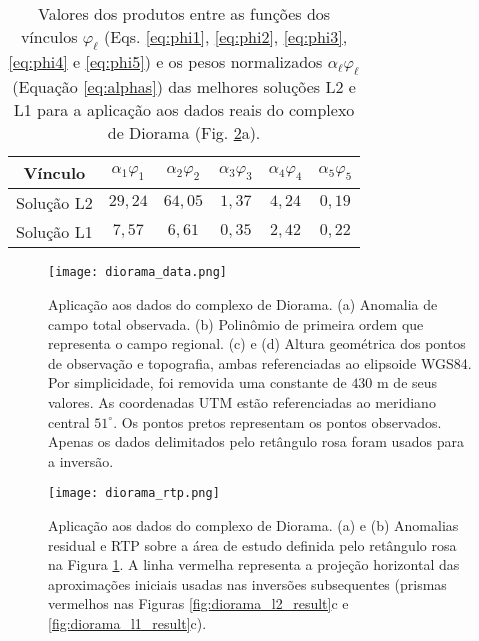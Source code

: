 \begin{table}[h]\label{tab:diorama}
	\caption{Valores dos produtos entre as funções dos vínculos $ \varphi_{\ell} $ (Eqs. \ref{eq:phi1}, \ref{eq:phi2}, \ref{eq:phi3}, \ref{eq:phi4} e \ref{eq:phi5}) e os pesos normalizados $ \alpha_\ell \varphi_\ell  $ (Equação \ref{eq:alphas}) das melhores soluções L2 e L1 para a aplicação aos dados reais do complexo de Diorama (Fig. \ref{fig:diorama_rtp_residual}a).}
	\centering
	\vspace{0.5cm}
	\begin{tabular}{c|ccccc}
		Vínculo & $ \alpha_{1}\varphi _1 $ & $ \alpha_{2}\varphi _2 $ &  $ \alpha_{3}\varphi _3 $ &  $ \alpha_{4}\varphi _4 $ &  $ \alpha_{5}\varphi _5 $ \\
		\hline
		Solução L2 & $ 29,24 $ & $ 64,05 $ & $ 1,37 $ & $ 4,24 $ & $ 0,19 $ \\ 
		Solução L1 & $ 7,57 $ & $ 6,61 $ & $ 0,35 $ & $ 2,42 $ & $ 0,22 $
	\end{tabular}
\end{table}



\begin{figure}[!htb]
	\texttt{[image: diorama\_data.png]}
	\caption{Aplicação aos dados do complexo de Diorama. 
		(a) Anomalia de campo total observada.
		(b) Polinômio de primeira ordem que representa o campo regional.
		(c) e (d) Altura geométrica dos pontos de observação e topografia,
		ambas referenciadas ao elipsoide WGS84. Por simplicidade, foi removida uma constante de $430$ m de seus valores. As coordenadas UTM estão referenciadas ao meridiano central $51^{\circ}$. Os pontos pretos representam os pontos observados. Apenas os dados delimitados pelo retângulo rosa foram usados para a inversão. 
	}
	\label{fig:diorama_data}
\end{figure}
\pagebreak

\begin{figure}[!htb]
	\texttt{[image: diorama\_rtp.png]}
	\caption{Aplicação aos dados do complexo de Diorama. 
		(a) e (b) Anomalias residual e RTP sobre a área de estudo definida pelo retângulo rosa na Figura \ref{fig:diorama_data}.
		A linha vermelha representa a projeção horizontal das aproximações iniciais usadas nas inversões subsequentes (prismas vermelhos nas Figuras \ref{fig:diorama_l2_result}c e \ref{fig:diorama_l1_result}c).
	}
	\label{fig:diorama_rtp_residual}
\end{figure}

